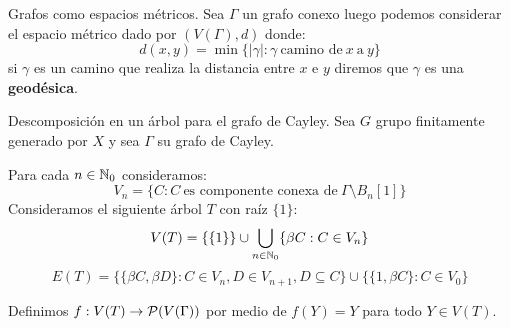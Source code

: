 \documentclass[aspectratio=169, 10pt]{beamer}
\begin{document}
	\begin{frame}[fragile]{Grafos como espacios métricos.}
		Sea $\Gamma$ un grafo conexo luego podemos considerar el espacio métrico dado por $(V(\Gamma), d)$ donde:
		\[
			d(x,y) = \min \{ |\gamma| : \gamma \ \text{camino de} \ x  \ \text{a} \ y  \}	
		\]
		\pause 
		si $\gamma$ es un camino que realiza la distancia entre $x$ e $y$ diremos que $\gamma$ es una \textbf{geodésica}.
		\pause 
	\end{frame}

	\begin{frame}[fragile]{Descomposición en un árbol para el grafo de Cayley.}
		Sea $G$ grupo finitamente generado por $X$ y sea $\Gamma$ su grafo de Cayley.
		
		\pause 
		Para cada $n \in \mathbb{N}_{0}$ consideramos:
		\[
			V_{n} = \{C : C \ \text{es componente conexa de} \ \Gamma \setminus B_{n}[1]\}	
		\]
		\pause 
		Consideramos el siguiente árbol $T$ con raíz $\{1\}$:
		\pause 
		\[
			V(T) = \{ \{1\}\} \cup \bigcup_{n \in \mathbb{N}_{0}}  \{ \beta C : C \in V_{n} \}
		\]
		\pause 
		\[
			E(T) = \{ \{\beta C, \beta D\} : C \in V_{n}, D \in V_{n+1}, D \subseteq C\} \cup 
			\{ \{1, \beta C\} : C \in V_{0} \}
		\]
		\pause 
		
		Definimos $f: V(T) \to {\cal{P}}(V(\Gamma))$ por medio de $f(Y) = Y$ para todo $Y \in V(T)$.
		\pause 
		
		
	\end{frame}
\end{document}
